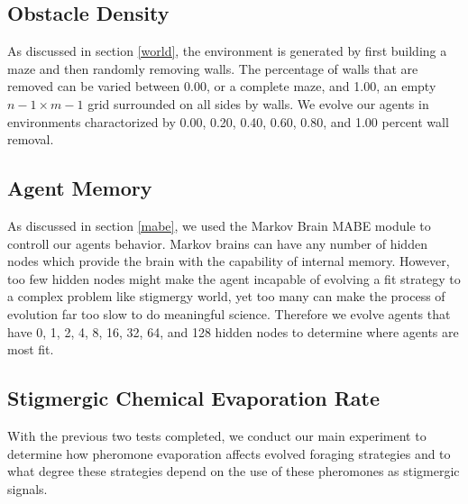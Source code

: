 \subsection*{Obstacle Density}

As discussed in section \ref{world}, the environment is generated by first building a maze and then randomly removing walls. The percentage of walls that are removed can be varied between 0.00, or a complete maze, and 1.00, an empty $n-1 \times m-1$ grid surrounded on all sides by walls. We evolve our agents in environments charactorized by 0.00, 0.20, 0.40, 0.60, 0.80, and 1.00 percent wall removal.

\subsection*{Agent Memory}

As discussed in section \ref{mabe}, we used the Markov Brain MABE module to controll our agents behavior. Markov brains can have any number of hidden nodes which provide the brain with the capability of internal memory. However, too few hidden nodes might make the agent incapable of evolving a fit strategy to a complex problem like stigmergy world, yet too many can make the process of evolution far too slow to do meaningful science. Therefore we evolve agents that have 0, 1, 2, 4, 8, 16, 32, 64, and 128 hidden nodes to determine where agents are most fit.

\subsection*{Stigmergic Chemical Evaporation Rate}

With the previous two tests completed, we conduct our main experiment to determine how pheromone evaporation affects evolved foraging strategies and to what degree these strategies depend on the use of these pheromones as stigmergic signals.
